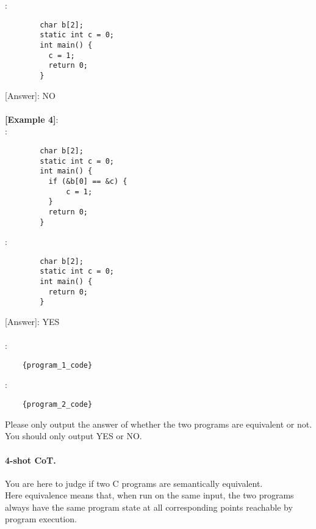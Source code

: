       \text{    [Program 2]}:\\
      \begin{lstlisting}
        char b[2];
        static int c = 0;
        int main() {
          c = 1;
          return 0;
        }
      \end{lstlisting}
      [Answer]: NO\\
\\
    \noindent\textbf{[Example 4]}:\\
      \text{    [Program 1]}:\\
      \begin{lstlisting}
        char b[2];
        static int c = 0;
        int main() {
          if (&b[0] == &c) {
              c = 1;
          }
          return 0;
        }
      \end{lstlisting}
      \text{    [Program 2]}:\\
      \begin{lstlisting}
        char b[2];
        static int c = 0;
        int main() {
          return 0;
        }
      \end{lstlisting}
      [Answer]: YES\\
\\
    \text{    [Program 1]}:\\
    \begin{lstlisting}
    {program_1_code}
    \end{lstlisting}
    \text{    [Program 2]}:\\
    \begin{lstlisting}
    {program_2_code}
    \end{lstlisting}
    
    Please only output the answer of whether the two programs are equivalent or not. You should only output YES or NO.\\

\paragraph{4-shot CoT.} You are here to judge if two C programs are semantically equivalent.\\
    Here equivalence means that, when run on the same input, the two programs always have the same program state at all corresponding points reachable by program execution.\\

